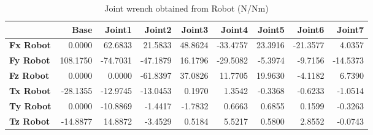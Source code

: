 \begin{table}[h!]
	\centering
	\caption{Joint wrench obtained from Robot (N/Nm)}
	\label{wrech_Robot_Pose2}
	\begin{tabular}{|l|r|r|r|r|r|r|r|r|}
		\hline
		\textbf{} & \textbf{Base} & \textbf{Joint1}  & \textbf{Joint2}  & \textbf{Joint3}  & \textbf{Joint4}  & \textbf{Joint5}  & \textbf{Joint6}  & \textbf{Joint7} \\ \hline
		\textbf{Fx Robot}  & 0.0000        & 62.6833        & 21.5833        & 48.8624        & -33.4757        & 23.3916        & -21.3577        & 4.0357 \\ \hline
		\textbf{Fy Robot}  & 108.1750        & -74.7031        & -47.1879        & 16.1796        & -29.5082        & -5.3974        & -9.7156        & -14.5373 \\ \hline
		\textbf{Fz Robot}  & 0.0000        & 0.0000        & -61.8397        & 37.0826        & 11.7705        & 19.9630        & -4.1182        & 6.7390 \\ \hline
		\textbf{Tx Robot}  & -28.1355        & -12.9745        & -13.0453        & 0.1970        & 1.3542        & -0.3368        & -0.6233        & -1.0514 \\ \hline
		\textbf{Ty Robot}  & 0.0000        & -10.8869        & -1.4417        & -1.7832        & 0.6663        & 0.6855        & 0.1599        & -0.3263 \\ \hline
		\textbf{Tz Robot}  & -14.8877        & 14.8872        & -3.4529        & 0.5184        & 5.5217        & 0.5800        & 2.8552        & -0.0743 \\ \hline
	\end{tabular}
\end{table}

